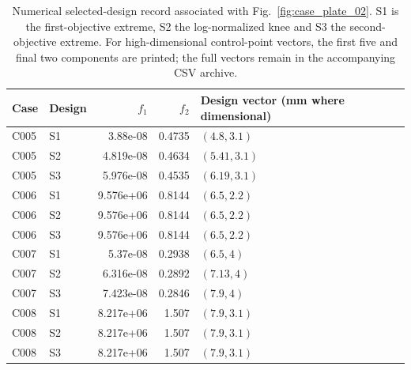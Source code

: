 \begin{table}[p]
\centering\scriptsize
\caption{Numerical selected-design record associated with Fig.~\ref{fig:case_plate_02}. S1 is the first-objective extreme, S2 the log-normalized knee and S3 the second-objective extreme. For high-dimensional control-point vectors, the first five and final two components are printed; the full vectors remain in the accompanying CSV archive.}
\label{tab:case_plate_02}
\setlength{\tabcolsep}{3.2pt}
\begin{tabularx}{\textwidth}{llrr>{\raggedright\arraybackslash}X}
\toprule Case & Design & $f_1$ & $f_2$ & Design vector (mm where dimensional) \\
\midrule
C005 & S1 & 3.88e-08 & 0.4735 & $(4.8, 3.1)$ \\
C005 & S2 & 4.819e-08 & 0.4634 & $(5.41, 3.1)$ \\
C005 & S3 & 5.976e-08 & 0.4535 & $(6.19, 3.1)$ \\
C006 & S1 & 9.576e+06 & 0.8144 & $(6.5, 2.2)$ \\
C006 & S2 & 9.576e+06 & 0.8144 & $(6.5, 2.2)$ \\
C006 & S3 & 9.576e+06 & 0.8144 & $(6.5, 2.2)$ \\
C007 & S1 & 5.37e-08 & 0.2938 & $(6.5, 4)$ \\
C007 & S2 & 6.316e-08 & 0.2892 & $(7.13, 4)$ \\
C007 & S3 & 7.423e-08 & 0.2846 & $(7.9, 4)$ \\
C008 & S1 & 8.217e+06 & 1.507 & $(7.9, 3.1)$ \\
C008 & S2 & 8.217e+06 & 1.507 & $(7.9, 3.1)$ \\
C008 & S3 & 8.217e+06 & 1.507 & $(7.9, 3.1)$ \\
\bottomrule
\end{tabularx}
\end{table}
